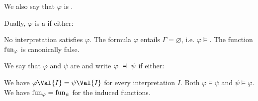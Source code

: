 \begin{definition}
\begin{DefEnum}
    We also say that \( \varphi \) is .

     Dually, \( \varphi \) is a  if either:
    \begin{itemize}
       No interpretation satisfies \( \varphi \).
       The formula \( \varphi \) entails \( \Gamma = \varnothing \), i.e. \( \varphi \vDash \).
       The function \( \operatorname{fun}_\varphi \) is canonically false.
    \end{itemize}

     We say that \( \varphi \) and \( \psi \) are  and write \( \varphi \Sequiv \psi \) if either:
    \begin{itemize}
       We have \( \varphi\Val{I} = \psi\Val{I} \) for every interpretation \( I \).
       Both \( \varphi \vDash \psi \) and \( \psi \vDash \varphi \).
       We have \( \operatorname{fun}_\varphi = \operatorname{fun}_\psi \) for the induced functions.
    \end{itemize}
  \end{DefEnum}
\end{definition}

